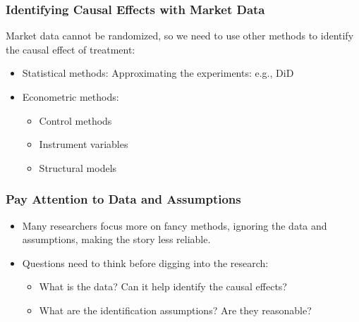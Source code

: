 \documentclass[10pt]{beamer}
\begin{document}
\begin{frame}
\frametitle{Identifying Causal Effects with Market Data}
Market data cannot be randomized, so we need to use other methods to identify the causal effect of treatment:
\begin{itemize}
    \item Statistical methods: Approximating the experiments: e.g., DiD
    \item Econometric methods:
    \begin{itemize}
        \item Control methods
        \item Instrument variables
        \item Structural models
    \end{itemize}
\end{itemize}
\end{frame}

\begin{frame}
\frametitle{Pay Attention to Data and Assumptions}
\begin{itemize}
    \item Many researchers focus more on fancy methods, ignoring the data and assumptions, making the story less reliable.
    \item Questions need to think before digging into the research:
    \begin{itemize}
        \item What is the data? Can it help identify the causal effects?
        \item What are the identification assumptions? Are they reasonable?
    \end{itemize}
\end{itemize}
\end{frame}
\end{document}
